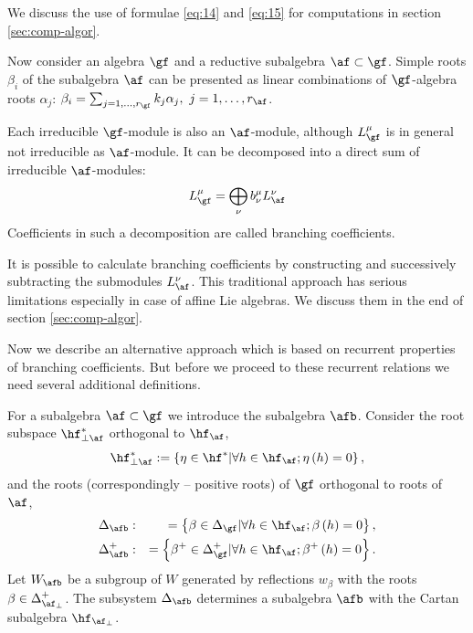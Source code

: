 We discuss the use of formulae \eqref{eq:14} and \eqref{eq:15} for computations in section \ref{sec:comp-algor}. 

Now consider an algebra $\gf$ and a reductive subalgebra
$\af\subset \gf$. Simple roots $\beta_{i}$ of the subalgebra $\af$
can be presented as linear combinations of $\gf$-algebra roots
$\alpha_{j}$: $\beta_{i}=\sum_{j=1,\dots,r_{\gf}}k_{j}
\alpha_{j},\ j=1,\dots,r_{\af}$.

Each irreducible $\gf$-module is also an $\af$-module, although
$L^{\mu}_{\gf}$ is in general not irreducible as $\af$-module. 
It can be
decomposed into a direct sum of irreducible $\af$-modules:
\begin{equation}
  \label{eq:16}
  L^{\mu}_{\gf}=\bigoplus_{\nu}b^{\mu}_{\nu}L^{\nu}_{\af}
\end{equation}
Coefficients in such a decomposition are called branching
coefficients. 

It is possible to calculate branching coefficients by constructing and successively  subtracting the submodules $L^{\nu}_{\af}$. 
This traditional approach has serious limitations especially in case of affine Lie algebras. We discuss them in the end of section \ref{sec:comp-algor}. 

Now we describe an alternative approach which is based on recurrent properties of branching coefficients. 
But before we proceed to these recurrent relations we need several additional definitions.

For a subalgebra $\af\subset \gf$ we introduce the subalgebra
$\afb$. Consider the root subspace $\hf_{\perp \af}^{\ast }$
orthogonal to $\hf_{\af}$,
\begin{equation*}
\hf_{\perp \af}^{\ast }:=\left\{ \eta \in \hf^{\ast }|\forall
h\in \hf_{\af};\eta \left( h\right) =0\right\} ,
\end{equation*}
and the roots (correspondingly -- positive roots) of $\gf$ orthogonal
to roots of $\af$,
\begin{eqnarray}
\Delta _{\afb} &:&=\left\{ \beta \in \Delta _{\gf}|\forall
h\in \hf_{\af};\beta \left( h\right) =0\right\} ,
\label{delta a ort} \\
\Delta _{\afb}^{+} &:&=\left\{ \beta ^{+}\in \Delta _{\gf%
}^{+}|\forall h\in \hf_{\af};\beta ^{+}\left( h\right) =0\right\} .
\notag
\end{eqnarray}
Let $W_{\afb}$ be a subgroup of $W$ generated by
reflections $w_{\beta }$ with the roots $\beta \in \Delta _{\af_{\perp
}}^{+}$. The subsystem $\Delta _{\afb}$ determines a 
subalgebra $\afb$ with the Cartan subalgebra $\hf_{\af%
_{\perp }}$.

